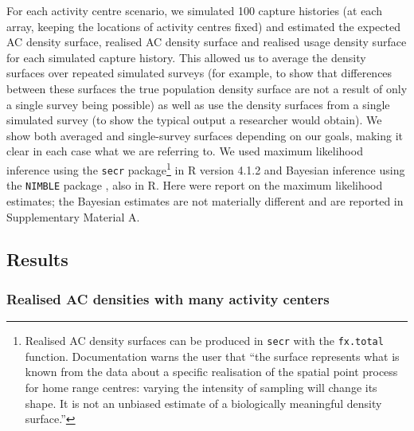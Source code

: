 \documentclass[10pt,a4paper]{article}
\begin{document}
For each activity centre scenario, we simulated 100 capture histories (at each array, keeping the locations of activity centres fixed) and estimated the expected AC density surface, realised AC density surface and realised usage density surface for each simulated capture history. This allowed us to average the density surfaces over repeated simulated surveys (for example, to show that differences between these surfaces the true population density surface are not a result of only a single survey being possible) as well as use the density surfaces from a single simulated survey (to show the typical output a researcher would obtain). We show both averaged and single-survey surfaces depending on our goals, making it clear in each case what we are referring to. We used maximum likelihood inference using the \texttt{secr} package\footnote{Realised AC density surfaces can be produced in \texttt{secr} with the \texttt{fx.total} function. Documentation warns the user that ``the surface represents what is known from the data about a specific realisation of the spatial point process for home range centres: varying the intensity of sampling will change its shape. It is not an unbiased estimate of a biologically meaningful density surface.''} \citep{secr:21} in R version 4.1.2 and Bayesian inference using the \texttt{NIMBLE} package \citep{deValpine:17, Turek:21}, also in R. Here were report on the maximum likelihood estimates; the Bayesian estimates are not materially different and are reported in Supplementary Material A.


\subsection{Results}

\subsubsection{Realised AC densities with many activity centers}
\end{document}
